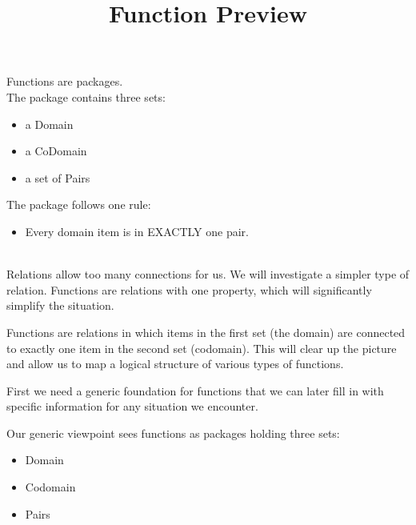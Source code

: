 \documentclass{ximera}
\title{Function Preview}
\begin{document}
\begin{abstract}
\end{abstract}

\maketitle





\begin{sectionOutcomes}

\begin{definition}
Functions are packages. \\
The package contains three sets:

\begin{itemize}
\item a Domain
\item a CoDomain
\item a set of Pairs
\end{itemize}

The package follows one rule:
\begin{itemize}
\item Every domain item is in EXACTLY one pair.
\end{itemize}
\end{definition}

\end{sectionOutcomes}




\quad \\


Relations allow too many connections for us.  We will investigate a simpler type of relation. Functions are relations with one property, which will significantly simplify the situation.

Functions are relations in which items in the first set (the domain) are connected to exactly one item in the second set (codomain).  This will clear up the picture and allow us to map a logical structure of various types of functions.

First we need a generic foundation for functions that we can later fill in with specific information for any situation we encounter. 

Our generic viewpoint sees functions as packages holding three sets:
\begin{itemize}
\item Domain 
\item Codomain 
\item Pairs
\end{itemize}
\end{document}
